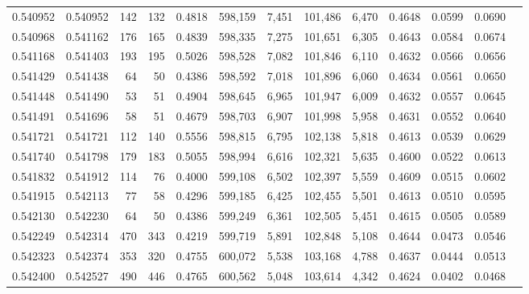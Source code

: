\begin{tabular}{rrrrrrrrrrrrr}
0.540952 & 0.540952 &   142 &   132 &                                     0.4818 & 598,159 &   7,451 & 101,486 &   6,470 & 0.4648 & 0.0599 & 0.0690 \\
0.540968 & 0.541162 &   176 &   165 &                                     0.4839 & 598,335 &   7,275 & 101,651 &   6,305 & 0.4643 & 0.0584 & 0.0674 \\
0.541168 & 0.541403 &   193 &   195 &                                     0.5026 & 598,528 &   7,082 & 101,846 &   6,110 & 0.4632 & 0.0566 & 0.0656 \\
0.541429 & 0.541438 &    64 &    50 &                                     0.4386 & 598,592 &   7,018 & 101,896 &   6,060 & 0.4634 & 0.0561 & 0.0650 \\
0.541448 & 0.541490 &    53 &    51 &                                     0.4904 & 598,645 &   6,965 & 101,947 &   6,009 & 0.4632 & 0.0557 & 0.0645 \\
0.541491 & 0.541696 &    58 &    51 &                                     0.4679 & 598,703 &   6,907 & 101,998 &   5,958 & 0.4631 & 0.0552 & 0.0640 \\
0.541721 & 0.541721 &   112 &   140 &                                     0.5556 & 598,815 &   6,795 & 102,138 &   5,818 & 0.4613 & 0.0539 & 0.0629 \\
0.541740 & 0.541798 &   179 &   183 &                                     0.5055 & 598,994 &   6,616 & 102,321 &   5,635 & 0.4600 & 0.0522 & 0.0613 \\
0.541832 & 0.541912 &   114 &    76 &                                     0.4000 & 599,108 &   6,502 & 102,397 &   5,559 & 0.4609 & 0.0515 & 0.0602 \\
0.541915 & 0.542113 &    77 &    58 &                                     0.4296 & 599,185 &   6,425 & 102,455 &   5,501 & 0.4613 & 0.0510 & 0.0595 \\
0.542130 & 0.542230 &    64 &    50 &                                     0.4386 & 599,249 &   6,361 & 102,505 &   5,451 & 0.4615 & 0.0505 & 0.0589 \\
0.542249 & 0.542314 &   470 &   343 &                                     0.4219 & 599,719 &   5,891 & 102,848 &   5,108 & 0.4644 & 0.0473 & 0.0546 \\
0.542323 & 0.542374 &   353 &   320 &                                     0.4755 & 600,072 &   5,538 & 103,168 &   4,788 & 0.4637 & 0.0444 & 0.0513 \\
0.542400 & 0.542527 &   490 &   446 &                                     0.4765 & 600,562 &   5,048 & 103,614 &   4,342 & 0.4624 & 0.0402 & 0.0468 \\

\end{tabular}
